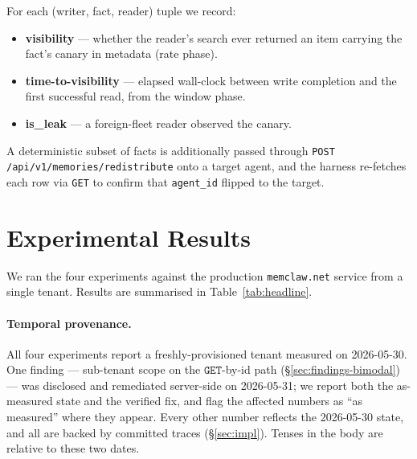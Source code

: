 \documentclass[10pt,twocolumn,letterpaper]{article}
\begin{document}
For each (writer, fact, reader) tuple we record:
\begin{itemize}
    \item \textbf{visibility} --- whether the reader's search ever returned an item carrying the fact's canary in metadata (rate phase).
    \item \textbf{time-to-visibility} --- elapsed wall-clock between write completion and the first successful read, from the window phase.
    \item \textbf{is\_leak} --- a foreign-fleet reader observed the canary.
\end{itemize}

A deterministic subset of facts is additionally passed through \texttt{POST /api/v1/memories/redistribute} onto a target agent, and the harness re-fetches each row via \texttt{GET} to confirm that \texttt{agent\_id} flipped to the target.

\section{Experimental Results}
\label{sec:results}

We ran the four experiments against the production \texttt{memclaw.net} service from a single tenant. Results are summarised in Table~\ref{tab:headline}.

\paragraph{Temporal provenance.} All four experiments report a freshly-provisioned tenant measured on 2026-05-30. One finding --- sub-tenant scope on the \(\mathtt{GET}\)-by-id path (\S\ref{sec:findings-bimodal}) --- was disclosed and remediated server-side on 2026-05-31; we report both the as-measured state and the verified fix, and flag the affected numbers as ``as measured'' where they appear. Every other number reflects the 2026-05-30 state, and all are backed by committed traces (\S\ref{sec:impl}). Tenses in the body are relative to these two dates.
\end{document}
